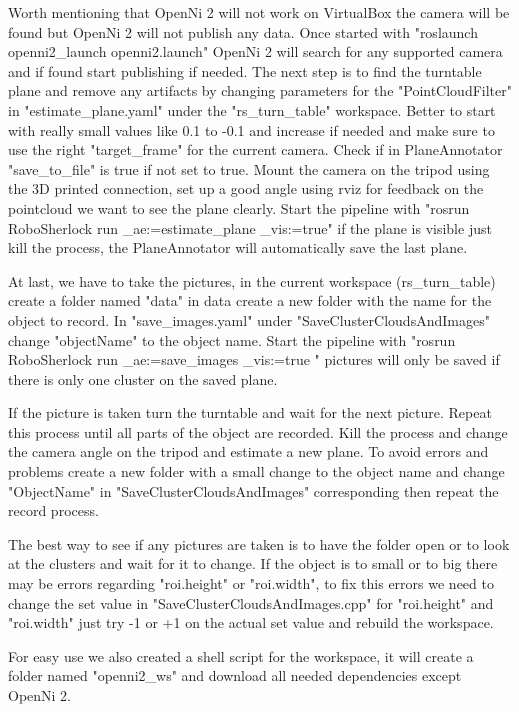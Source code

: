\documentclass[main.tex]{subfiles}
\begin{document}
		Worth mentioning that OpenNi 2 will not work on VirtualBox the camera will be found but OpenNi 2 will not publish any data.
		Once started with "roslaunch openni2\_launch openni2.launch" OpenNi 2 will search for any supported camera and
		if found start publishing if needed. The next step is to find the turntable plane and remove any artifacts by changing parameters
		for the "PointCloudFilter" in "estimate\_plane.yaml" under the "rs\_turn\_table" workspace.
		Better to start with really small values like 0.1 to -0.1 and increase if needed
		and make sure to use the right "target\_frame" for the current camera.
		Check if in PlaneAnnotator "save\_to\_file" is true if not set to true.
		Mount the camera on the tripod using the 3D printed connection,
		set up a good angle using rviz for feedback on the pointcloud we want to see the plane clearly.
		Start the pipeline with "rosrun RoboSherlock run \_ae:=estimate\_plane \_vis:=true"
		if the plane is visible just kill the process, the PlaneAnnotator will automatically save the last plane.

		At last, we have to take the pictures, in the current workspace (rs\_turn\_table) create a folder named "data"
		in data create a new folder with the name for the object to record.
		In "save\_images.yaml" under "SaveClusterCloudsAndImages" change "objectName" to the object name.
		Start the pipeline with "rosrun RoboSherlock run \_ae:=save\_images \_vis:=true " pictures will only be saved
		if there is only one cluster on the saved plane.

		If the picture is taken turn the turntable and wait for the next picture.
		Repeat this process until all parts of the object are recorded.
		Kill the process and change the camera angle on the tripod and estimate a new plane.
		To avoid errors and problems create a new folder with a small change to the object name
		and change "ObjectName" in "SaveClusterCloudsAndImages" corresponding then repeat the record process.

		The best way to see if any pictures are taken is to have the folder open or to look at the clusters and wait for it to change.
		If the object is to small or to big there may be errors regarding "roi.height" or "roi.width",
		to fix this errors we need to change the set value in "SaveClusterCloudsAndImages.cpp"
		for "roi.height" and "roi.width" just try -1 or +1 on the actual set value and rebuild the workspace.

		For easy use we also created a shell script for the workspace, it will create a folder named "openni2\_ws"
		and download all needed dependencies except OpenNi 2.
\end{document}
